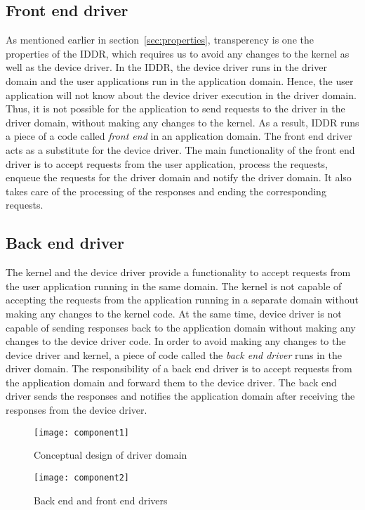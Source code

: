 \subsection{Front end driver}
\label{subsec:frontend}
As mentioned earlier in section~\ref{sec:properties}, transperency is one the properties of the IDDR, which requires us to avoid any changes to the kernel as well as the device driver. In the IDDR, the device driver runs in the driver domain and the user applications run in the application domain. Hence, the user application will not know about the device driver execution in the driver domain. Thus, it is not possible for the application to send requests to the driver in the driver domain, without making any changes to the kernel. As a result, IDDR runs a piece of a code called \textit{front end} in an application domain. The front end driver acts as a substitute for the device driver. The main functionality of the front end driver is to accept requests from the user application, process the requests, enqueue the requests for the driver domain and notify the driver domain. It also takes care of the processing of the responses and ending the corresponding requests.

\subsection{Back end driver}
\label{subsec:backend}
The kernel and the device driver provide a functionality to accept requests from the user application running in the same domain. The kernel is not capable of accepting the requests from the application running in a separate domain without making any changes to the kernel code. At the same time, device driver is not capable of sending responses back to the application domain without making any changes to the device driver code. In order to avoid making any changes to the device driver and kernel, a piece of code called the \textit{back end driver} runs in the driver domain. The responsibility of a back end driver is to accept requests from the application domain and forward them to the device driver. The back end driver sends the responses and notifies the application domain after receiving the responses from the device driver.
\begin{figure}[!ht]
\centering
\texttt{[image: component1]}
\caption{Conceptual design of driver domain}
\label{fig:conept}
\end{figure}
\begin{figure}[!ht]
\centering
\texttt{[image: component2]}
\caption{Back end and front end drivers}
\label{fig:backendfrontend}
\end{figure}

